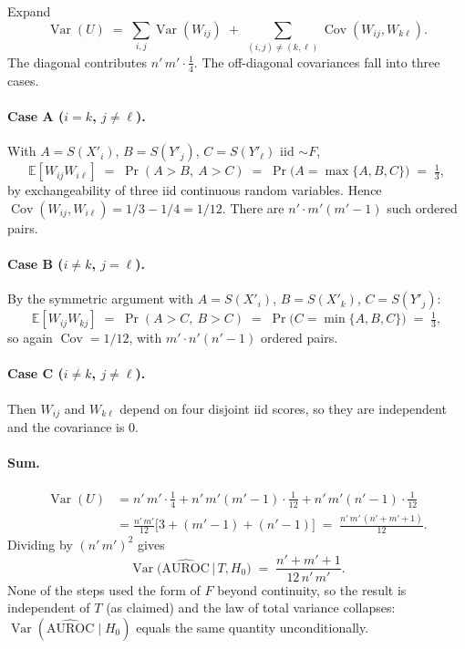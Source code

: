 \documentclass[11pt]{article}
\newcommand{\E}{\mathbb{E}}
\newcommand{\Var}{\operatorname{Var}}
\newcommand{\Cov}{\operatorname{Cov}}
\newcommand{\1}{\mathbf{1}}
\begin{document}
Expand
\[
  \Var(U) \;=\; \sum_{i,j} \Var(W_{ij})
                  \;+\; \sum_{(i,j) \ne (k,\ell)} \Cov(W_{ij}, W_{k\ell}).
\]
The diagonal contributes $n'\,m' \cdot \tfrac{1}{4}$. The off-diagonal
covariances fall into three cases.

\paragraph{Case A ($i = k$, $j \ne \ell$).}
With $A = S(X'_i)$, $B = S(Y'_j)$, $C = S(Y'_\ell)$ iid $\sim F$,
\[
  \E[W_{ij} W_{i\ell}] \;=\; \Pr(A > B,\ A > C)
   \;=\; \Pr\!\bigl(A = \max\{A,B,C\}\bigr) \;=\; \tfrac{1}{3},
\]
by exchangeability of three iid continuous random variables. Hence
$\Cov(W_{ij}, W_{i\ell}) = 1/3 - 1/4 = 1/12$. There are
$n' \cdot m'(m' - 1)$ such ordered pairs.

\paragraph{Case B ($i \ne k$, $j = \ell$).}
By the symmetric argument with $A = S(X'_i)$, $B = S(X'_k)$,
$C = S(Y'_j)$:
\[
  \E[W_{ij} W_{kj}] \;=\; \Pr(A > C,\ B > C)
   \;=\; \Pr\!\bigl(C = \min\{A,B,C\}\bigr) \;=\; \tfrac{1}{3},
\]
so again $\Cov = 1/12$, with $m' \cdot n'(n' - 1)$ ordered pairs.

\paragraph{Case C ($i \ne k$, $j \ne \ell$).}
Then $W_{ij}$ and $W_{k\ell}$ depend on four disjoint iid scores, so they
are independent and the covariance is $0$.

\paragraph{Sum.}
\begin{align*}
  \Var(U)
  &= n'\,m' \cdot \tfrac{1}{4}
   + n'\,m'(m' - 1) \cdot \tfrac{1}{12}
   + n'\,m'(n' - 1) \cdot \tfrac{1}{12} \\
  &= \tfrac{n'\,m'}{12}\bigl[3 + (m' - 1) + (n' - 1)\bigr]
   \;=\; \frac{n'\,m'\,(n' + m' + 1)}{12}.
\end{align*}
Dividing by $(n'\,m')^2$ gives
\[
  \Var\!\bigl(\widehat{\mathrm{AUROC}} \,\big|\, T, H_0\bigr)
   \;=\; \frac{n' + m' + 1}{12\,n'\,m'}.
\]
None of the steps used the form of $F$ beyond continuity, so the result
is independent of $T$ (as claimed) and the law of total variance
collapses: $\Var(\widehat{\mathrm{AUROC}} \mid H_0)$ equals the same
quantity unconditionally.
\end{document}
